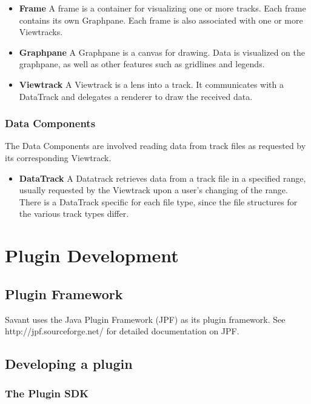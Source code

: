 \documentclass{report}
\begin{document}
\begin{itemize}
\item{} {\bf Frame} A frame is a container for visualizing one or more tracks. Each frame contains its own Graphpane. Each frame is also associated with one or more Viewtracks.
\item{} {\bf Graphpane} A Graphpane is a canvas for drawing. Data is visualized on the graphpane, as well as other features such as gridlines and legends.
\item{} {\bf Viewtrack} A Viewtrack is a lens into a track. It communicates with a DataTrack and delegates a renderer to draw the received data.
\end{itemize}

\subsection{Data Components}

The Data Components are involved reading data from track files as requested by its corresponding Viewtrack. 

\begin{itemize}
\item{} {\bf DataTrack} A Datatrack retrieves data from a track file in a specified range, usually requested by the Viewtrack upon a user's changing of the range. There is a DataTrack specific for each file type, since the file structures for the various track types differ. 
\end{itemize}

\chapter{Plugin Development}

\section{Plugin Framework}

Savant uses the Java Plugin Framework (JPF) as its plugin framework. See http://jpf.sourceforge.net/ for detailed documentation on JPF.

\section{Developing a plugin}

\subsection{The Plugin SDK}
\end{document}
